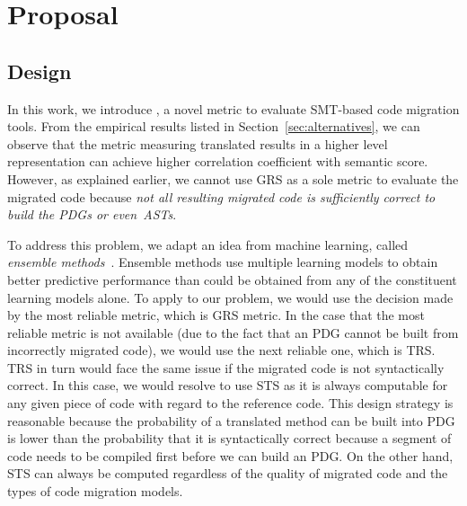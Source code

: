 \section{Proposal}
\label{sec:proposal}


\subsection{Design}

%

In this work, we introduce {\model}, a novel metric to evaluate
SMT-based code migration tools.  From the empirical results
listed in Section~\ref{sec:alternatives}, we can observe that the
metric measuring translated results in a higher level representation
can achieve higher correlation coefficient with semantic score.
However, as explained earlier, we cannot use GRS as a sole metric to
evaluate the migrated code because {\em not all resulting migrated
code is sufficiently correct to build the PDGs or even~ASTs}.

To address this problem, we adapt an idea from machine learning,
called {\em ensemble methods}~\cite{ensemble}. Ensemble methods
use multiple learning models to obtain better
predictive performance than could be obtained from any of the
constituent learning models alone.
To apply to our problem, we would use the decision made by the most
reliable metric, which is GRS metric. In the case that the most
reliable metric is not available (due to the fact that an PDG cannot
be built from incorrectly migrated code), we would use the next
reliable one, which is TRS. TRS in turn would face the same issue if
the migrated code is not syntactically correct. In this case, we would
resolve to use STS as it is always computable for any given piece of
code with regard to the reference code. This design strategy is
reasonable because the probability of a translated method can be built
into PDG is lower than the probability that it is syntactically
correct because a segment of code needs to be compiled first before we
can build an PDG. On the other hand, STS can always be computed
regardless of the quality of migrated code and the types of code
migration models.

